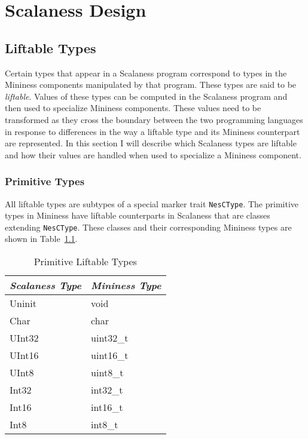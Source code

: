 \chapter{Scalaness Design}
\label{chap:scalaness-design}

\section{Liftable Types}

Certain types that appear in a Scalaness program correspond to types in the Mininess components
manipulated by that program. These types are said to be \textit{liftable}. Values of these types
can be computed in the Scalaness program and then used to specialize Mininess components. These
values need to be transformed as they cross the boundary between the two programming languages
in response to differences in the way a liftable type and its Mininess counterpart are
represented. In this section I will describe which Scalaness types are liftable and how their
values are handled when used to specialize a Mininess component.

\subsection{Primitive Types}

All liftable types are subtypes of a special marker trait \texttt{NesCType}. The primitive types
in Mininess have liftable counterparts in Scalaness that are classes extending
\texttt{NesCType}. These classes and their corresponding Mininess types are shown in
Table~\ref{tbl:primitive-liftable}.

\begin{table}
  \centering
  \caption{Primitive Liftable Types}
  \label{tbl:primitive-liftable}
  \begin{tabular}{|l|l|} \hline
    \textit{Scalaness Type} & \textit{Mininess Type} \\ \hline
    Uninit & void      \\ \hline
    Char   & char      \\ \hline
    UInt32 & uint32\_t \\ \hline
    UInt16 & uint16\_t \\ \hline
    UInt8  & uint8\_t  \\ \hline
    Int32  & int32\_t  \\ \hline
    Int16  & int16\_t  \\ \hline
    Int8   & int8\_t   \\ \hline
  \end{tabular}
\end{table}

